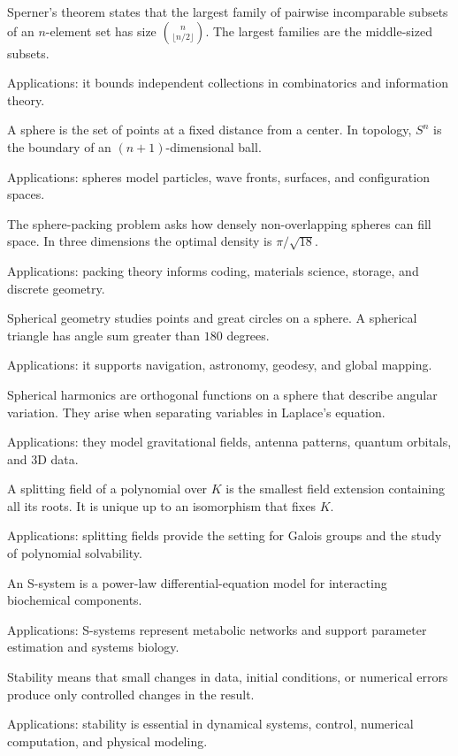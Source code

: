 Sperner's theorem states that the largest family of pairwise incomparable subsets of an $n$-element set has size $\binom{n}{\lfloor n/2\rfloor}$. The largest families are the middle-sized subsets. \par\noindent Applications: it bounds independent collections in combinatorics and information theory.

A sphere is the set of points at a fixed distance from a center. In topology, $S^n$ is the boundary of an $(n+1)$-dimensional ball. \par\noindent Applications: spheres model particles, wave fronts, surfaces, and configuration spaces.

The sphere-packing problem asks how densely non-overlapping spheres can fill space. In three dimensions the optimal density is $\pi/\sqrt{18}$. \par\noindent Applications: packing theory informs coding, materials science, storage, and discrete geometry.

Spherical geometry studies points and great circles on a sphere. A spherical triangle has angle sum greater than $180$ degrees. \par\noindent Applications: it supports navigation, astronomy, geodesy, and global mapping.

Spherical harmonics are orthogonal functions on a sphere that describe angular variation. They arise when separating variables in Laplace's equation. \par\noindent Applications: they model gravitational fields, antenna patterns, quantum orbitals, and 3D data.

A splitting field of a polynomial over $K$ is the smallest field extension containing all its roots. It is unique up to an isomorphism that fixes $K$. \par\noindent Applications: splitting fields provide the setting for Galois groups and the study of polynomial solvability.

An S-system is a power-law differential-equation model for interacting biochemical components. \par\noindent Applications: S-systems represent metabolic networks and support parameter estimation and systems biology.

Stability means that small changes in data, initial conditions, or numerical errors produce only controlled changes in the result. \par\noindent Applications: stability is essential in dynamical systems, control, numerical computation, and physical modeling.

